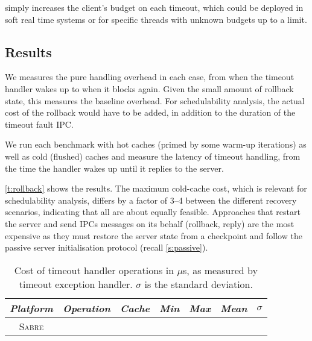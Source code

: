         simply increases the client's budget on each timeout, which could be
        deployed in soft real time systems or for specific threads with unknown budgets up to a
        limit. 


\subsection{Results}

We measures the pure handling overhead in each case, from when the timeout handler wakes up to when it blocks again. 
 Given the small amount of rollback state, this measures the baseline
    overhead. For schedulability analysis, the actual cost of the rollback would
have to be added, in addition to the duration of the timeout fault IPC. 
 
We run each benchmark with hot caches (primed by some warm-up
iterations)  as well as cold (flushed) caches and measure the 
latency of timeout handling, from the time the handler wakes up
until it replies to the server.

\autoref{t:rollback} shows the results. The maximum
cold-cache cost, which is relevant for schedulability analysis,
differs by a factor of 3--4 between the different recovery scenarios,
indicating that all are about equally feasible.
Approaches that restart the server and send \glspl{IPC} messages on its behalf (rollback, reply) are the most expensive
as they must restore the server state from a
checkpoint and follow the passive server initialisation protocol
(recall \autoref{s:passive}). 

\begin{table}[t]\centering
\begin{tabular}{cllrrrr}\toprule
\emph{Platform} & \emph{Operation} & \emph{Cache} & \emph{Min} &
                          \emph{Max} & \emph{Mean} &
                          \multicolumn{1}{c}{\boldmath \(\sigma\)} \\\midrule
                          \multirow{8}{*}{\textsc{Sabre}} 
                           
                          \midrule
                          \multirow{8}{*}{\textsc{x64}}
                          
                          \bottomrule
\end{tabular}
\caption{Cost of timeout handler operations in \(\mu\)s, as measured
  by timeout exception handler. \(\sigma\) is the standard deviation.}
\label{t:rollback}
\end{table}


